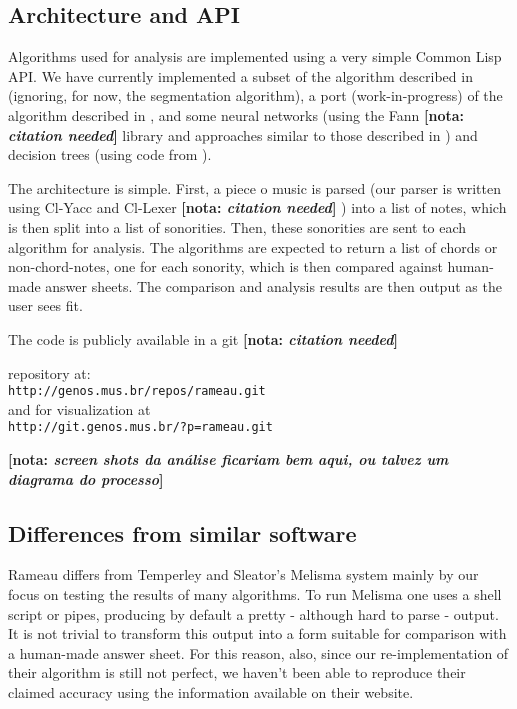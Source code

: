 \documentclass{article}
\newcommand{\nota}[1]{
  \textbf{[nota: \textit{#1}]}
}
\begin{document}
\subsection{Architecture and API}
\label{sec:architecture-and-api}

Algorithms used for analysis are implemented using a very simple
Common Lisp API. We have currently implemented a subset of the
algorithm described in \cite{pardo02:algorithms} (ignoring, for now,
the segmentation algorithm), a port (work-in-progress) of the
algorithm described in \cite{temperley99:modeling}, and some neural
networks (using the Fann \nota{citation needed} library and approaches
similar to those described in
\cite{tsui02:_harmon_analy_using_neural_networ}) and decision trees
(using code from \cite{Mitchell:1997:ML}).

The architecture is simple. First, a piece o music is parsed (our
parser is written using Cl-Yacc and Cl-Lexer \nota{citation needed})
into a list of notes, which is then split into a list of
sonorities. Then, these sonorities are sent to each algorithm for
analysis. The algorithms are expected to return a list of chords or
non-chord-notes, one for each sonority, which is then compared against
human-made answer sheets. The comparison and analysis results are
then output as the user sees fit.

The code is publicly available in a git \nota{citation needed}
repository at:\\
\texttt{http://genos.mus.br/repos/rameau.git}\\
and for visualization at\\
\texttt{http://git.genos.mus.br/?p=rameau.git}

\nota{screen shots da análise ficariam bem aqui, ou talvez um diagrama
  do processo}

\subsection{Differences from similar software}
\label{sec:differences-from-similar-software}

Rameau differs from Temperley and Sleator's Melisma
\cite{temperley99:modeling} system mainly by our focus on testing the
results of many algorithms. To run Melisma one uses a shell script or
pipes, producing by default a pretty - although hard to parse -
output. It is not trivial to transform this output into a form
suitable for comparison with a human-made answer sheet. For this
reason, also, since our re-implementation of their algorithm is still
not perfect, we haven't been able to reproduce their claimed accuracy
using the information available on their website.
\end{document}
